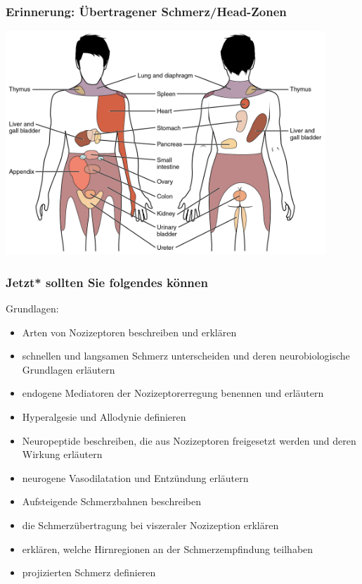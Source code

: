 \documentclass{beamer}
\begin{document}
\begin{frame}
\frametitle{Erinnerung: Übertragener Schmerz/Head-Zonen}



\begin{center}
\includegraphics[width=0.9\textwidth]{Referred_Pain_Chart.jpg}
\end{center}

\end{frame}




\begin{frame}


 \frametitle{Jetzt* sollten Sie folgendes können}



\begin{block}{Grundlagen:}




\begin{itemize}

    \item 
    
Arten von Nozizeptoren beschreiben und erklären
    \item 
 schnellen und langsamen Schmerz unterscheiden und deren neurobiologische Grundlagen erläutern
    \item 
 endogene Mediatoren der Nozizeptorerregung benennen und erläutern
    \item 
    Hyperalgesie und Allodynie definieren
    \item 
 Neuropeptide beschreiben, die aus Nozizeptoren freigesetzt werden und deren Wirkung erläutern
    \item 
 neurogene Vasodilatation und Entzündung erläutern
    \item 
 Aufsteigende Schmerzbahnen beschreiben
    \item 
 die Schmerzübertragung bei viszeraler Nozizeption erklären
    \item 
erklären, welche  Hirnregionen an der Schmerzempfindung teilhaben
    \item 
 projizierten Schmerz definieren

\end{itemize}


\end{block}

\end{frame}
\end{document}
